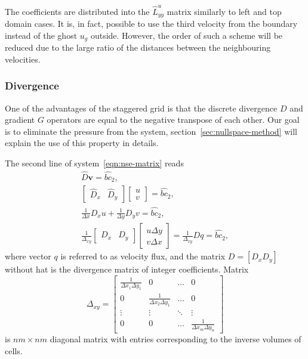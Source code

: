 \documentclass{article}
\begin{document}
The coefficients are distributed into the $\hat{L}^u_{yy}$ matrix similarly to left and top domain cases. It is, in fact, possible to use the third velocity from the boundary instead of the ghost $u_g$ outside. However, the order of such a scheme will be reduced due to the large ratio of the distances between the neighbouring velocities. 


\subsubsection{Divergence}\label{subsec:divergence}

One of the advantages of the staggered grid is that the discrete divergence $D$ and gradient $G$ operators are equal to the negative transpose of each other. Our goal is to eliminate the pressure from the system, section~\ref{sec:nullspace-method} will explain the use of this property in details. 

The second line of system~\eqref{eqn:nse-matrix} reads
\begin{equation}
\begin{gathered}
\hat{D}\boldsymbol{v}=\hat{bc}_2,\\
\left[ 
\begin{array}{ll}
\hat{D}_x & \hat{D}_y 	
\end{array}
\right]\left[\begin{array}{l}
u\\
v
\end{array}
\right]=\hat{bc}_2
, \\
\frac{1}{\Delta x} D_x u+\frac{1}{\Delta y} D_y v=\hat{bc}_2, \\
\frac{1}{\Delta _{xy}}\left[\begin{array}{ll}
D_x & D_y
\end{array}\right]\left[\begin{array}{l}
u \Delta y \\
v \Delta x
\end{array}\right]=\frac{1}{\Delta _{xy}} D q=\hat{bc}_2,
\end{gathered}
\end{equation}
where vector $q$ is referred to as velocity flux, and the matrix $D=[D_x D_y]$ without hat is the divergence matrix of integer coefficients. Matrix
\begin{equation}\label{eqn:delta-xy}
	\Delta _{xy}=
	\begin{bmatrix}{}
		\frac{1}{\Delta x_1\Delta y_1}		&0	&\dots	&0\\
		0		&\frac{1}{\Delta x_2\Delta y_1}	&\dots	&0\\
		\vdots		&\vdots	&\ddots	&\vdots\\
		0		&0	&\dots	&\frac{1}{\Delta x_m\Delta y_n}
	\end{bmatrix}
\end{equation}
is $nm\times nm$ diagonal matrix with entries corresponding to the inverse volumes of cells. 
\end{document}
